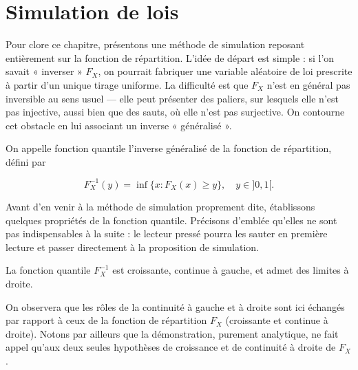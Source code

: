 \newpage

\section{Simulation de lois}

Pour clore ce chapitre, présentons une méthode de simulation reposant entièrement sur la fonction de répartition. L'idée de départ est simple : si l'on savait « inverser » $F_X$, on pourrait fabriquer une variable aléatoire de loi prescrite à partir d'un unique tirage uniforme. La difficulté est que $F_X$ n'est en général pas inversible au sens usuel — elle peut présenter des paliers, sur lesquels elle n'est pas injective, aussi bien que des sauts, où elle n'est pas surjective. On contourne cet obstacle en lui associant un inverse « généralisé ».

\medskip

\begin{mdframed}
\begin{definition}
On appelle fonction quantile l'inverse généralisé de la fonction de répartition, défini par

$$
F_X^{-1}(y) = \inf \{x : F_X(x) \geq y\}, \quad y \in ]0, 1[.
$$
\end{definition}
\end{mdframed}

Avant d'en venir à la méthode de simulation proprement dite, établissons quelques propriétés de la fonction quantile. Précisons d'emblée qu'elles ne sont pas indispensables à la suite : le lecteur pressé pourra les sauter en première lecture et passer directement à la proposition de simulation.

\medskip

\begin{mdframed}
\begin{proposition}
La fonction quantile $F_X^{-1}$ est croissante, continue à gauche, et admet des limites à droite.
\end{proposition}
\end{mdframed}

On observera que les rôles de la continuité à gauche et à droite sont ici échangés par rapport à ceux de la fonction de répartition $F_X$ (croissante et continue à droite). Notons par ailleurs que la démonstration, purement analytique, ne fait appel qu'aux deux seules hypothèses de croissance et de continuité à droite de $F_X$.

